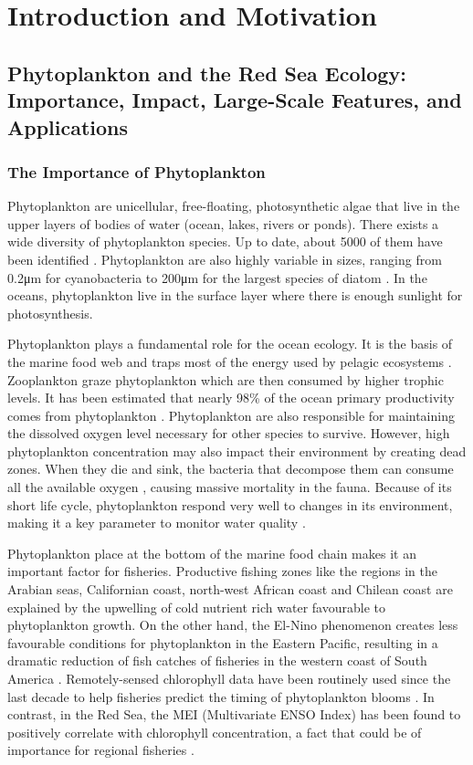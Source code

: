 \chapter{Introduction and Motivation}

\section{Phytoplankton and the Red Sea Ecology: Importance, Impact, Large-Scale
Features, and Applications}

\subsection{The Importance of Phytoplankton}

Phytoplankton are unicellular, free-floating, photosynthetic algae that live in the upper layers of bodies of water (ocean, lakes, rivers or ponds). There exists a wide diversity of phytoplankton species. Up to date, about 5000 of them have been identified \citep{Tett1995}. Phytoplankton are also highly variable in sizes, ranging from 0.2μm for cyanobacteria to 200μm for the largest species of diatom \citep{Pal2014}. In the oceans, phytoplankton live in the surface layer where there is enough sunlight for photosynthesis. 

Phytoplankton plays a fundamental role for the ocean ecology. It is the basis of the marine food web and traps most of the energy used by pelagic ecosystems \citep{Pal2014}. Zooplankton graze phytoplankton which are then consumed by higher trophic levels. It has been estimated that nearly 98\% of the ocean primary productivity comes from phytoplankton \citep{Pal2014}. Phytoplankton are also responsible for maintaining the dissolved oxygen level necessary for other species to survive. However, high phytoplankton concentration may also impact their environment by creating dead zones. When they die and sink, the bacteria that decompose them can consume all the available oxygen \citep{Pal2014}, causing massive mortality in the fauna. Because of its short life cycle, phytoplankton respond very well to changes in its environment, making it a key parameter to monitor water quality \citep{Wu2014}.

Phytoplankton place at the bottom of the marine food chain makes it an important factor for fisheries. Productive fishing zones like the regions in the Arabian seas, Californian coast, north-west African coast and Chilean coast are explained by the upwelling of cold nutrient rich water favourable to phytoplankton growth. On the other hand, the El-Nino phenomenon creates less favourable conditions for phytoplankton in the Eastern Pacific, resulting in a dramatic reduction of fish catches of fisheries in the western coast of South America \citep{Robinson2010}. Remotely-sensed chlorophyll data have been routinely used since the last decade to help fisheries predict the timing of phytoplankton blooms \citep{Robinson2010}. In contrast, in the Red Sea, the MEI (Multivariate ENSO Index) has been found to positively correlate with chlorophyll concentration, a fact that could be of importance for regional fisheries \citep{Raitsos2015}.


